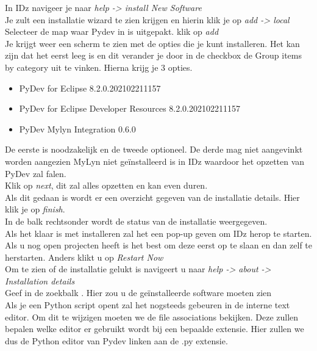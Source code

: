 In IDz navigeer je naar  \textit{help -> install New Software}  \\

Je zult een installatie wizard te zien krijgen en hierin klik je op \textit{add -> local} \\

Selecteer de map waar Pydev in is uitgepakt. klik op \textit{add} \\

Je krijgt weer een scherm te zien met de opties die je kunt installeren. Het kan zijn dat het eerst leeg is en dit verander je door in de checkbox de Group items by category uit te vinken. Hierna krijg je 3 opties.

\begin{itemize}
    \item PyDev for Eclipse 8.2.0.202102211157
    \item PyDev for Eclipse Developer Resources 8.2.0.202102211157
    \item PyDev Mylyn Integration 0.6.0
\end{itemize}

De eerste is noodzakelijk en de tweede optioneel. De derde mag niet aangevinkt worden aangezien MyLyn niet geïnstalleerd is in IDz waardoor het opzetten van PyDev zal falen. \\ 

Klik op \textit{next}, dit zal alles opzetten en kan even duren. \\

Als dit gedaan is wordt er een overzicht gegeven van de installatie details. Hier klik je op \textit{finish}. \\

In de balk rechtsonder wordt de status van de installatie weergegeven. \\

Als het klaar is met installeren zal het een pop-up geven om IDz herop te starten. Als u nog open projecten heeft is het best om deze eerst op te slaan en dan zelf te herstarten. Anders klikt u op \textit{Restart Now} \\ 

Om te zien of de installatie gelukt is navigeert u naar \textit{help -> about -> Installation details} \\

Geef in de zoekbalk . Hier zou u de geïnstalleerde software moeten zien \\ 

Als je een Python script opent zal het nogsteeds gebeuren in de interne text editor. Om dit te wijzigen moeten we de file associations bekijken. Deze zullen bepalen welke editor er gebruikt wordt bij een bepaalde extensie. Hier zullen we dus de Python editor van Pydev linken aan de .py extensie. \\


